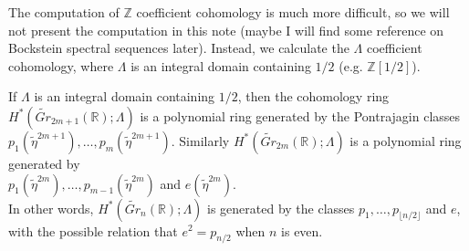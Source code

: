 	The computation of $\mathbb{Z}$ coefficient cohomology is much more difficult, so we will not present the computation in this note (maybe I will find some reference on Bockstein spectral sequences later). Instead, we calculate the $\Lambda$ coefficient cohomology, where $\Lambda$ is an integral domain containing $1/2$ (e.g. $\mathbb{Z}[1/2]$). 
	\begin{thm}
		If $\Lambda$ is an integral domain containing $1/2$, then the cohomology ring \\
		$H^*(\widetilde{Gr}_{2m+1}(\mathbb{R});\Lambda)$ is a polynomial ring generated by the Pontrajagin classes \\
		$p_1(\tilde{\eta}^{2m+1}),\dots,p_m(\tilde{\eta}^{2m+1})$. Similarly $H^*(\widetilde{Gr}_{2m}(\mathbb{R});\Lambda)$ is a polynomial ring generated by \\
		$p_1(\tilde{\eta}^{2m}),\dots,p_{m-1}(\tilde{\eta}^{2m})$ and $e(\tilde{\eta}^{2m})$. \\
		In other words, $H^*(\widetilde{Gr}_n(\mathbb{R});\Lambda)$ is generated by the classes $p_1,\dots,p_{\lfloor n/2\rfloor}$ and $e$, with the possible relation that $e^2=p_{n/2}$ when $n$ is even. 
	\end{thm}
